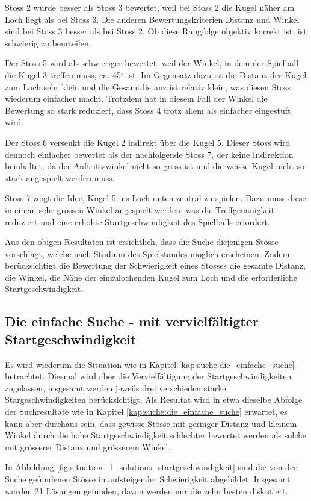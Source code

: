 Stoss 2 wurde besser als Stoss 3 bewertet, weil bei Stoss 2 die Kugel näher am Loch liegt als bei Stoss 3. Die anderen
Bewertungskriterien Distanz und Winkel sind bei Stoss 3 besser als bei Stoss 2.
Ob diese Rangfolge objektiv korrekt ist, ist schwierig zu beurteilen.

Der Stoss 5 wird als schwieriger bewertet, weil der Winkel, in dem der Spielball die Kugel 3 treffen muss, ca. 45$^{\circ}$ ist.
Im Gegensatz dazu ist die Distanz der Kugel zum Loch sehr klein und die Gesamtdistanz ist relativ klein, was diesen Stoss
wiederum einfacher macht. Trotzdem hat in diesem Fall der Winkel die Bewertung so stark reduziert, dass Stoss 4 trotz allem
als einfacher eingestuft wird.

Der Stoss 6 versenkt die Kugel 2 indirekt über die Kugel 5. Dieser Stoss wird dennoch einfacher bewertet als der
nachfolgende Stoss 7, der keine Indirektion beinhaltet, da der Auftrittswinkel nicht so gross ist und die weisse Kugel
nicht so stark angespielt werden muss.

Stoss 7 zeigt die Idee, Kugel 5 ins Loch unten-zentral zu spielen.
Dazu muss diese in einem sehr grossen Winkel angespielt werden, was die Treffgenauigkeit reduziert und eine
erhöhte Startgeschwindigkeit des Spielballs erfordert.

Aus den obigen Resultaten ist ersichtlich, dass die Suche diejenigen Stösse vorschlägt, welche nach Studium des Spielstandes
möglich erscheinen. Zudem berücksichtigt die Bewertung der Schwierigkeit eines Stosses die gesamte Distanz, die Winkel, die Nähe
der einzulochenden Kugel zum Loch und die erforderliche Startgeschwindigkeit.

\subsection{Die einfache Suche - mit vervielfältigter Startgeschwindigkeit}
Es wird wiederum die Situation wie in Kapitel \ref{kap:suche:die_einfache_suche} betrachtet. Diesmal wird aber die Vervielfältigung der Startgeschwindigkeiten
zugelassen, insgesamt werden jeweils drei verschieden starke Stargeschwindigkeiten berücksichtigt.
Als Resultat wird in etwa dieselbe Abfolge der Suchresultate wie in Kapitel \ref{kap:suche:die_einfache_suche} erwartet, es kann aber durchaus
sein, dass gewisse Stösse mit geringer Distanz und kleinem Winkel durch die hohe Startgeschwindigkeit schlechter bewertet werden
als solche mit grösserer Distanz und grösserem Winkel.

In Abbildung \ref{fig:situation_1_solutions_startgeschwindigkeit} sind die von der Suche gefundenen Stösse in aufsteigender Schwierigkeit abgebildet.
Insgesamt wurden 21 Lösungen gefunden, davon werden nur die zehn besten diskutiert.


